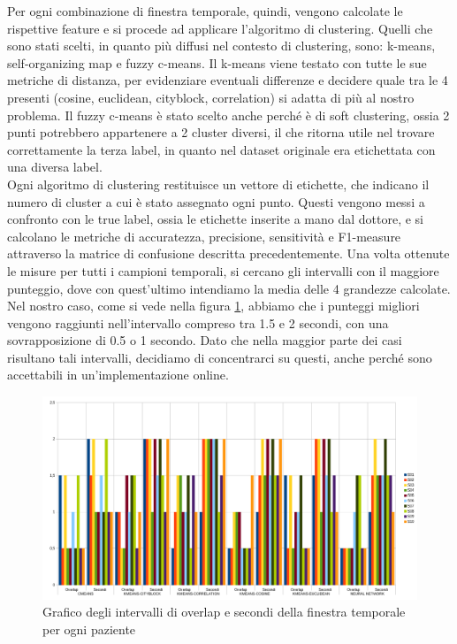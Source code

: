 Per ogni combinazione di finestra temporale, quindi, vengono calcolate le rispettive feature e si procede ad applicare l'algoritmo di clustering. Quelli che sono stati scelti, in quanto più diffusi nel contesto di clustering, sono: k-means, self-organizing map e fuzzy c-means. Il k-means viene testato con tutte le sue metriche di distanza, per evidenziare eventuali differenze e decidere quale tra le 4 presenti (cosine, euclidean, cityblock, correlation) si adatta di più al nostro problema. Il fuzzy c-means è stato scelto anche perché è di soft clustering, ossia 2 punti potrebbero appartenere a 2 cluster diversi, il che ritorna utile nel trovare correttamente la terza label, in quanto nel dataset originale era etichettata con una diversa label.\\
Ogni algoritmo di clustering restituisce un vettore di etichette, che indicano il numero di cluster a cui è stato assegnato ogni punto. Questi vengono messi a confronto con le true label, ossia le etichette inserite a mano dal dottore, e si calcolano le metriche di accuratezza, precisione, sensitività e F1-measure attraverso la matrice di confusione descritta precedentemente. Una volta ottenute le misure per tutti i campioni temporali, si cercano gli intervalli con il maggiore punteggio, dove con quest'ultimo intendiamo la media delle 4 grandezze calcolate. Nel nostro caso, come si vede nella figura \ref{SecondiOverlap}, abbiamo che i punteggi migliori vengono raggiunti nell'intervallo compreso tra 1.5 e 2 secondi, con una sovrapposizione di 0.5 o 1 secondo. Dato che nella maggior parte dei casi risultano tali intervalli, decidiamo di concentrarci su questi, anche perché sono accettabili in un'implementazione online.
\begin{figure}[]
	\centering
	\includegraphics[scale=0.35]{images/secondi_overlap.png}
	\caption{Grafico degli intervalli di overlap e secondi della finestra temporale per ogni paziente}
	\label{SecondiOverlap}
\end{figure}
